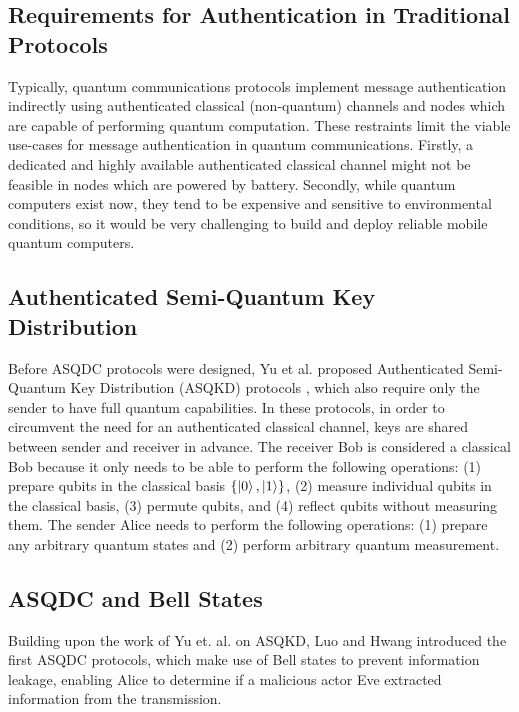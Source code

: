 \documentclass[conference,compsoc]{IEEEtran}
\begin{document}
\subsection{Requirements for Authentication in Traditional Protocols}

Typically, quantum communications protocols implement message
authentication indirectly using authenticated classical (non-quantum)
channels and nodes which are capable of performing quantum computation.
These restraints limit the viable use-cases for message authentication
in quantum communications. Firstly, a dedicated and highly available
authenticated classical channel might not be feasible in nodes which are
powered by battery. Secondly, while quantum computers exist now, they tend
to be expensive and sensitive to environmental conditions, so it would be very
challenging to build and deploy reliable mobile quantum computers.

\subsection{Authenticated Semi-Quantum Key Distribution}

Before ASQDC protocols were designed, Yu et al. proposed Authenticated
Semi-Quantum Key Distribution (ASQKD) protocols \cite{YuEtAl}, which also
require only the sender to have full quantum capabilities. In these protocols,
in order to circumvent the need for an authenticated classical channel,
keys are shared between sender and receiver in advance. The receiver Bob is
considered a classical Bob because it only needs
to be able to perform the following operations: (1) prepare qubits
in the classical basis $\left\{ \ket{0} ,\ket{1} \right\} $,
(2) measure individual qubits in the classical basis, (3) permute
qubits, and (4) reflect qubits without measuring them. The sender Alice needs
to perform the following operations: (1) prepare any arbitrary quantum states and
(2) perform arbitrary quantum measurement.

\subsection{ASQDC and Bell States}

Building upon the work of Yu et. al. on ASQKD, Luo and Hwang introduced the first
ASQDC protocols, which make use of Bell states to prevent information leakage,
enabling Alice to determine if a malicious actor Eve extracted
information from the transmission.
\end{document}
